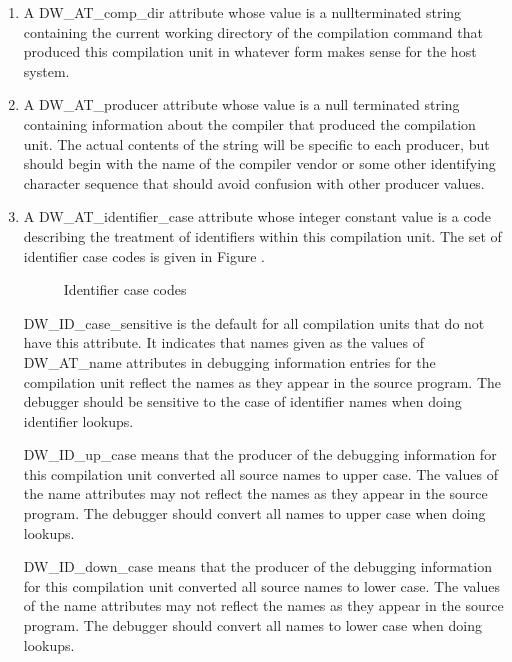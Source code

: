 \begin{enumerate}[1]
\item  A DW\_AT\_comp\_dir attribute whose value is a
null\dash terminated string containing the current working directory
of the compilation command that produced this compilation
unit in whatever form makes sense for the host system.

\item  A DW\_AT\_producer attribute whose value is a null\dash
terminated string containing information about the compiler
that produced the compilation unit. The actual contents of
the string will be specific to each producer, but should
begin with the name of the compiler vendor or some other
identifying character sequence that should avoid confusion
with other producer values.


\item  A DW\_AT\_identifier\_case attribute whose integer
constant value is a code describing the treatment
of identifiers within this compilation unit. The
set of identifier case codes is given in Figure
.

\begin{figure}[here]
\caption{Identifier case codes}\label{fig:identifiercasecodes}
\end{figure}

DW\_ID\_case\_sensitive is the default for all compilation units
that do not have this attribute.  It indicates that names given
as the values of DW\_AT\_name attributes in debugging information
entries for the compilation unit reflect the names as they
appear in the source program. The debugger should be sensitive
to the case of identifier names when doing identifier lookups.

DW\_ID\_up\_case means that the producer of the debugging
information for this compilation unit converted all source
names to upper case. The values of the name attributes may not
reflect the names as they appear in the source program. The
debugger should convert all names to upper case when doing
lookups.

DW\_ID\_down\_case means that the producer of the debugging
information for this compilation unit converted all source
names to lower case. The values of the name attributes may not
reflect the names as they appear in the source program. The
debugger should convert all names to lower case when doing
lookups.


\end{enumerate}
